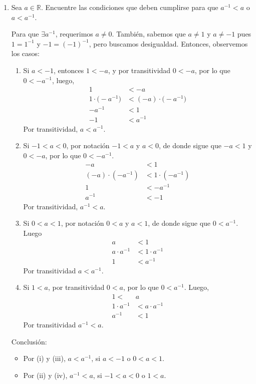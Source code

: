 \documentclass[11pt]{article}
\newcommand{\R}{\mathbb{R}}
\begin{document}
\begin{enumerate}[label=\alph*)]
 \item Sea $a\in \R$. Encuentre las condiciones que deben cumplirse para que $a^{-1}<a$ o $a<a^{-1}$.
 
 Para que $\exists a^{-1}$, requerimos $a\neq 0$. También, sabemos que $a\neq 1$ y $a\neq -1$ pues $1=1^{-1}$ y $-1=(-1)^{-1}$, pero buscamos desigualdad. Entonces, observemos los casos: \begin{enumerate}[label=\roman*)]
  \item Si $a<-1$, entonces $1<-a$, y por transitividad $0<-a$, por lo que $0<-a^{-1}$, luego, \begin{align*}
   1 &< -a \\
   1\cdot \bigl(-a^{-1}\bigr) &< (-a) \cdot \bigl(-a^{-1}\bigr) \\
   -a^{-1} &< 1\\
   -1 &< a^{-1}
  \end{align*} Por transitividad, $a < a^{-1}$.
  \item Si $-1<a<0$, por notación $-1<a$ y $a<0$, de donde sigue que $-a<1$ y $0<-a$, por lo que $0<-a^{-1}$. \begin{align*}
   -a &< 1 \\
   (-a) \cdot (-a^{-1}) &< 1\cdot (-a^{-1})\\
   1 &< -a^{-1}\\
   a^{-1} &< -1
  \end{align*} Por transitividad, $a^{-1}<a$.
  \item Si $0<a<1$, por notación $0<a$ y $a<1$, de donde sigue que $0<a^{-1}$. Luego \begin{align*}
   a &< 1 \\
   a\cdot a^{-1} &< 1 \cdot a^{-1}\\
   1 &< a^{-1}
  \end{align*} Por transitividad $a<a^{-1}$.
  \item Si $1<a$, por transitividad $0<a$, por lo que $0<a^{-1}$. Luego, \begin{align*}
   1 <& a\\
   1 \cdot a^{-1} &< a \cdot a^{-1}\\
   a^{-1} &< 1
  \end{align*} Por transitividad $a^{-1}<a$.
 \end{enumerate}
 Conclusión: \begin{itemize}
  \item Por (i) y (iii), $a<a^{-1}$, si $a<-1$ o $0<a<1$.
  \item Por (ii) y (iv), $a^{-1}<a$, si $-1<a<0$ o $1<a$.
 \end{itemize}


\end{enumerate}
\end{document}
